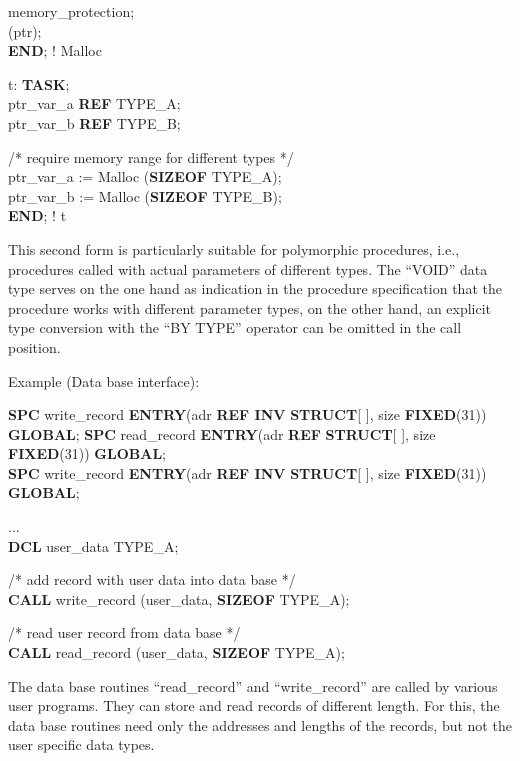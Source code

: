 \begin{removed}
 memory\_protection;\\
(ptr);\\
{\bf END}; ! Malloc

t: {\bf TASK};\\
 ptr\_var\_a {\bf REF} TYPE\_A;\\
 ptr\_var\_b {\bf REF} TYPE\_B;

\x /* require memory range for different types */\\
\x ptr\_var\_a := Malloc ({\bf SIZEOF} TYPE\_A);\\
\x ptr\_var\_b := Malloc ({\bf SIZEOF} TYPE\_B);\\
{\bf END}; ! t

This second form is particularly suitable for polymorphic procedures,
i.e., procedures called with actual parameters of different types. The
``VOID'' data type serves on the one hand as indication in the procedure
specification that the procedure works with different parameter types,
on the other hand, an explicit type conversion with the ``BY TYPE''
operator can be omitted in the call position.

Example (Data base interface):

\begin{tabbing}
{\bf SPC} write\_record \= {\bf ENTRY}(adr {\bf REF INV} \= {\bf STRUCT}[ ], size {\bf FIXED}(31)) {\bf GLOBAL}; \kill
{\bf SPC} read\_record  \> {\bf ENTRY}(adr {\bf REF}     \> {\bf STRUCT}[ ], size {\bf FIXED}(31)) {\bf GLOBAL}; \\
{\bf SPC} write\_record \> {\bf ENTRY}(adr {\bf REF INV} \> {\bf STRUCT}[ ], size {\bf FIXED}(31)) {\bf GLOBAL};
\end{tabbing}

...\\
{\bf DCL} user\_data TYPE\_A;

/* add record with user data into data base */\\
{\bf CALL} write\_record (user\_data, {\bf SIZEOF} TYPE\_A);

/* read user record from data base */\\
{\bf CALL} read\_record (user\_data, {\bf SIZEOF} TYPE\_A);

The data base routines ``read\_record'' and ``write\_record'' are
called by various user programs. They can store and read records of
different length.  For this, the data base routines need only the
addresses and lengths of the records, but not the user specific data
types.
\end{removed}

